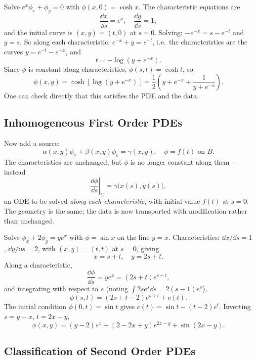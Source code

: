 \begin{example}
    Solve $e^x \phi_x + \phi_y = 0$ with $\phi(x, 0) = \cosh x$.
    The characteristic equations are
    $$
    \frac{\dd x}{\dd s} = e^x, \quad \frac{\dd y}{\dd s} = 1,
    $$
    and the initial curve is $(x, y) = (t, 0)$ at $s = 0$. Solving: $-e^{-x} = s - e^{-t}$ and $y = s$. So along each characteristic, $e^{-x} + y = e^{-t}$, i.e.\ the characteristics are the curves $y = e^{-t} - e^{-x}$, and
    $$
    t = -\log\left(y + e^{-x}\right).
    $$
    Since $\phi$ is constant along characteristics, $\phi(s, t) = \cosh t$, so
    $$
    \phi(x, y) = \cosh \left[\log\left(y + e^{-x}\right)\right] = \frac{1}{2}\left(y + e^{-x} + \frac{1}{y + e^{-x}}\right).
    $$
    One can check directly that this satisfies the PDE and the data.
\end{example}

\subsection{Inhomogeneous First Order PDEs}

Now add a source:
$$
\alpha(x, y) \phi_x + \beta(x, y) \phi_y = \gamma(x, y), \quad \phi = f(t) \text{ on } B.
$$
The characteristics are unchanged, but $\phi$ is no longer constant along them -- instead
$$
\left.\frac{\dd \phi}{\dd s}\right|_C = \gamma\big(x(s), y(s)\big),
$$
an ODE to be solved \emph{along each characteristic}, with initial value $f(t)$ at $s = 0$. The geometry is the same; the data is now transported with modification rather than unchanged.

\begin{example}
    Solve $\phi_x + 2 \phi_y = y e^x$ with $\phi = \sin x$ on the line $y = x$.
    Characteristics: $\dd x/\dd s = 1$, $\dd y /\dd s = 2$, with $(x, y) = (t, t)$ at $s = 0$, giving
    $$
    x = s + t, \quad y = 2s + t.
    $$
    Along a characteristic,
    $$
    \frac{\dd \phi}{\dd s} = y e^x = (2s + t)e^{s + t},
    $$
    and integrating with respect to $s$ (noting $\int 2s e^s \dd s = 2(s-1)e^s$),
    $$
    \phi(s, t) = (2s + t - 2)e^{s + t} + c(t).
    $$
    The initial condition $\phi(0, t) = \sin t$ gives $c(t) = \sin t - (t - 2)e^t$. Inverting $s = y - x$, $t = 2x - y$,
    $$
    \phi(x, y) = (y - 2) e^x + (2 - 2x + y)e^{2x - y} + \sin (2x - y).
    $$
\end{example}

\subsection{Classification of Second Order PDEs}


